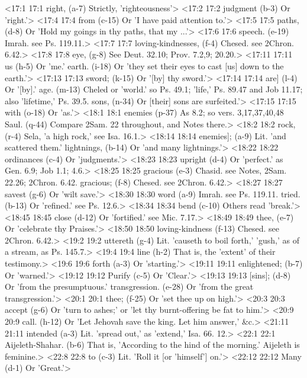 <17:1 17:1  right, (a-7)  Strictly, 'righteousness'>
<17:2 17:2  judgment (b-3)  Or 'right.'>
<17:4 17:4  from (c-15)  Or 'I have paid attention to.'>
<17:5 17:5  paths, (d-8)  Or 'Hold my goings in thy paths, that my ...'>
<17:6 17:6  speech. (e-19)  Imrah. see Ps. 119.11.>
<17:7 17:7  loving-kindnesses, (f-4)  Chesed. see 2Chron. 6.42.>
<17:8 17:8  eye, (g-8)  See Deut. 32.10; Prov. 7.2,9; 20.20.>
<17:11 17:11  us (h-5)  Or 'me.'
  earth. (i-18)  Or 'they set their eyes to cast [us] down to the earth.'>
<17:13 17:13  sword; (k-15)  Or '[by] thy sword.'>
<17:14 17:14  are] (l-4)  Or '[by].'
  age. (m-13)  Cheled or 'world.' so Ps. 49.1; 'life,' Ps. 89.47 and Job  11.17; also 'lifetime,' Ps. 39.5.
  sons, (n-34)  Or [their] sons are surfeited.'>
<17:15 17:15  with (o-18)  Or 'as.'>
<18:1 18:1  enemies (p-37)  As 8.2; so vers. 3,17,37,40,48
  Saul. (q-44)  Compare 2Sam. 22 throughout, and Notes there.>
<18:2 18:2  rock, (r-4)  Sela, 'a high rock,' see Isa. 16.1.>
<18:14 18:14  enemies]; (a-9)  Lit. 'and scattered them.'
  lightnings, (b-14)  Or 'and many lightnings.'>
<18:22 18:22  ordinances (c-4)  Or 'judgments.'>
<18:23 18:23  upright (d-4)  Or 'perfect.' as Gen. 6.9; Job 1.1; 4.6.>
<18:25 18:25  gracious (e-3)  Chasid. see Notes, 2Sam. 22.26; 2Chron. 6.42.
  gracious; (f-8)  Chesed. see 2Chron. 6.42.>
<18:27 18:27  savest (g-6)  Or 'wilt save.'>
<18:30 18:30  word (a-9)  Imrah. see Ps. 119.11.
  tried. (b-13)  Or 'refined.' see Ps. 12.6.>
<18:34 18:34  bend (c-10)  Others read 'break.'>
<18:45 18:45  close (d-12)  Or 'fortified.' see Mic. 7.17.>
<18:49 18:49  thee, (e-7)  Or 'celebrate thy Praises.'>
<18:50 18:50  loving-kindness (f-13)  Chesed. see 2Chron. 6.42.>
<19:2 19:2  uttereth (g-4)  Lit. 'causeth to boil forth,' 'gush,' as of a stream, as Ps. 145.7.>
<19:4 19:4  line (h-2)  That is, the 'extent' of their testimony.>
<19:6 19:6  forth (a-3)  Or 'starting.'>
<19:11 19:11  enlightened; (b-7)  Or 'warned.'>
<19:12 19:12  Purify (c-5)  Or 'Clear.'>
<19:13 19:13  [sins]; (d-8)  Or 'from the presumptuous.'
  transgression. (e-28)  Or 'from the great transgression.'>
<20:1 20:1  thee; (f-25)  Or 'set thee up on high.'>
<20:3 20:3  accept (g-6)  Or 'turn to ashes;' or 'let thy burnt-offering be fat to  him.'>
<20:9 20:9  call. (h-12)  Or 'Let Jehovah save the king. Let him answer,' &c.>
<21:11 21:11  intended (a-3)  Lit. 'spread out,' as 'extend,' Isa. 66. 12.>
<22:1 22:1  Aijeleth-Shahar. (b-6)  That is, 'According to the hind of the morning.' Aijeleth  is feminine.>
<22:8 22:8  to (c-3)  Lit. 'Roll it [or 'himself'] on.'>
<22:12 22:12  Many (d-1)  Or 'Great.'>

